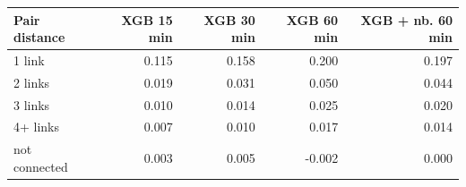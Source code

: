 \begin{tabular}{@{}lrrrr@{}}
\toprule
Pair distance & XGB 15 min & XGB 30 min & XGB 60 min & XGB + nb. 60 min \\
\midrule
1 link & 0.115 & 0.158 & 0.200 & 0.197 \\
2 links & 0.019 & 0.031 & 0.050 & 0.044 \\
3 links & 0.010 & 0.014 & 0.025 & 0.020 \\
4+ links & 0.007 & 0.010 & 0.017 & 0.014 \\
not connected & 0.003 & 0.005 & -0.002 & 0.000 \\
\bottomrule
\end{tabular}
